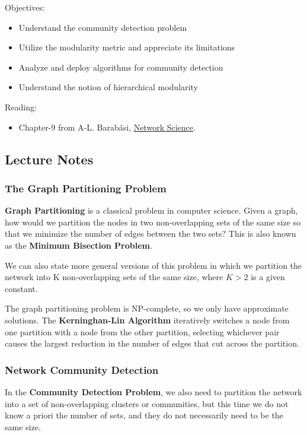 \documentclass[11pt]{scrartcl} %
\begin{document}
Objectives:
\begin{itemize}
	\item Understand the community detection problem
	\item Utilize the modularity metric and appreciate its limitations
	\item Analyze and deploy algorithms for community detection
	\item Understand the notion of hierarchical modularity
\end{itemize}

Reading:
\begin{itemize}
	\item Chapter-9 from A-L. Barabási, \href{http://networksciencebook.com/}{Network Science}.
\end{itemize}

\subsection{Lecture Notes}

\subsubsection{The Graph Partitioning Problem}
\textbf{Graph Partitioning} is a classical problem in computer science. Given a graph, how would we partition the nodes in two non-overlapping sets of the same size so that we minimize the number of edges between the two sets? This is also known as the \textbf{Minimum Bisection Problem}.

We can also state more general versions of this problem in which we partition the network into K non-overlapping sets of the same size, where $K>2$ is a given constant.

The graph partitioning problem is NP-complete, so we only have approximate solutions. The \textbf{Kerninghan-Lin Algorithm} iteratively switches a node from one partition with a node from the other partition, selecting whichever pair causes the largest reduction in the number of edges that cut across the partition.

\subsubsection{Network Community Detection}
In the \textbf{Community Detection Problem}, we also need to partition the network into a set of non-overlapping clusters or communities, but this time we do not know a priori the number of sets, and they do not necessarily need to be the same size.
\end{document}

